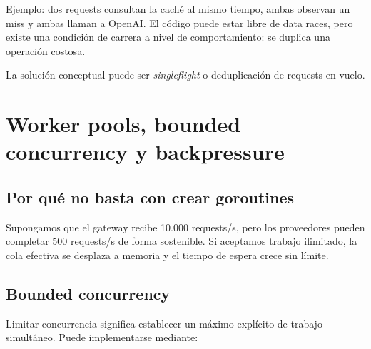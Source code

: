 \documentclass[11pt,a4paper]{article}
\begin{document}
Ejemplo: dos requests consultan la caché al mismo tiempo, ambas observan un miss y ambas llaman a OpenAI. El código puede estar libre de data races, pero existe una condición de carrera a nivel de comportamiento: se duplica una operación costosa.

La solución conceptual puede ser \emph{singleflight} o deduplicación de requests en vuelo.

\section{Worker pools, bounded concurrency y backpressure}

\subsection{Por qué no basta con crear goroutines}

Supongamos que el gateway recibe 10.000 requests/s, pero los proveedores pueden completar 500 requests/s de forma sostenible. Si aceptamos trabajo ilimitado, la cola efectiva se desplaza a memoria y el tiempo de espera crece sin límite.

\begin{center}
\end{center}

\subsection{Bounded concurrency}

Limitar concurrencia significa establecer un máximo explícito de trabajo simultáneo. Puede implementarse mediante:
\end{document}
